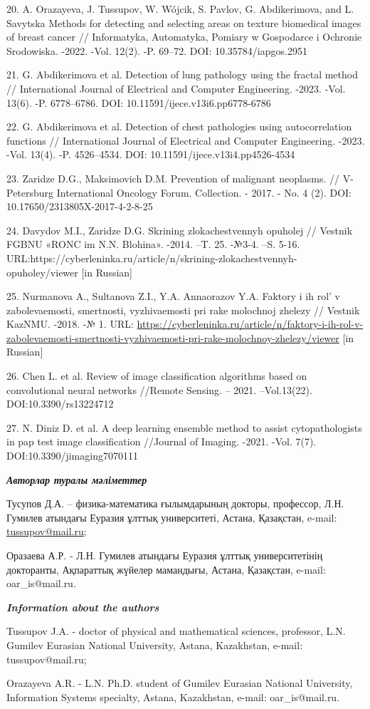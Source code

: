 20. A. Orazayeva, J. Tussupov, W. Wójcik, S. Pavlov, G. Abdikerimova,
and L. Savytska Methods for detecting and selecting areas on texture
biomedical images of breast cancer // Informatyka, Automatyka, Pomiary w
Gospodarce i Ochronie Srodowiska. -2022. -Vol. 12(2). -P. 69--72. DOI:
10.35784/iapgos.2951

21. G. Abdikerimova et al. Detection of lung pathology using the fractal
method // International Journal of Electrical and Computer Engineering.
-2023. -Vol. 13(6). -P. 6778--6786. DOI:
10.11591/ijece.v13i6.pp6778-6786

22. G. Abdikerimova et al. Detection of chest pathologies using
autocorrelation functions // International Journal of Electrical and
Computer Engineering. -2023. -Vol. 13(4). -P. 4526--4534. DOI:
10.11591/ijece.v13i4.pp4526-4534

23. Zaridze D.G., Maksimovich D.M. Prevention of malignant neoplasms. //
V-Petersburg International Oncology Forum. Collection. - 2017. - No. 4
(2). DOI: 10.17650/2313805X-2017-4-2-8-25

24. Davydov M.I., Zaridze D.G. Skrining zlokachestvennyh opuholej //
Vestnik FGBNU «RONC im N.N. Blohina». -2014. --T. 25. -№3-4. --S. 5-16.
URL:https://cyberleninka.ru/article/n/skrining-zlokachestvennyh-opuholey/viewer
{[}in Russian{]}

25. Nurmanova A., Sultanova Z.I., Y.A. Annaorazov Y.A. Faktory i ih
rol'{} v zabolevaemosti, smertnosti, vyzhivaemosti pri
rake molochnoj zhelezy // Vestnik KazNMU. -2018. -№ 1. URL:
\url{https://cyberleninka.ru/article/n/faktory-i-ih-rol-v-zabolevaemosti-smertnosti-vyzhivaemosti-pri-rake-molochnoy-zhelezy/viewer}
{[}in Russian{]}

26. Chen L. et al. Review of image classification algorithms based on
convolutional neural networks //Remote Sensing. -- 2021. --Vol.13(22).
DOI:10.3390/rs13224712

27. N. Diniz D. et al. A deep learning ensemble method to assist
cytopathologists in pap test image classification //Journal of Imaging.
-2021. -Vol. 7(7). DOI:10.3390/jimaging7070111

\begin{authorinfo}
\hspace{1em}\emph{{\bfseries Авторлар туралы мәліметтер}}

Тусупов Д.А. -- физика-математика ғылымдарының докторы, профессор, Л.Н.
Гумилев атындағы Еуразия ұлттық университеті, Астана, Қазақстан, e-mail:
\href{mailto:oaris.83@gmail.com}{tussupov@mail.ru};

Оразаева А.Р. - Л.Н. Гумилев атындағы Еуразия ұлттық университетінің
докторанты, Ақпараттық жүйелер мамандығы, Астана, Қазақстан, e-mail:
oar\_is@mail.ru.

\hspace{1em}\emph{{\bfseries Information about the authors}}

Tussupov J.A. - doctor of physical and mathematical sciences, professor,
L.N. Gumilev Eurasian National University, Astana, Kazakhstan, e-mail:
tussupov@mail.ru;

Orazayeva A.R. - L.N. Ph.D. student of Gumilev Eurasian National
University, Information Systems specialty, Astana, Kazakhstan, e-mail:
oar\_is@mail.ru.
\end{authorinfo}

